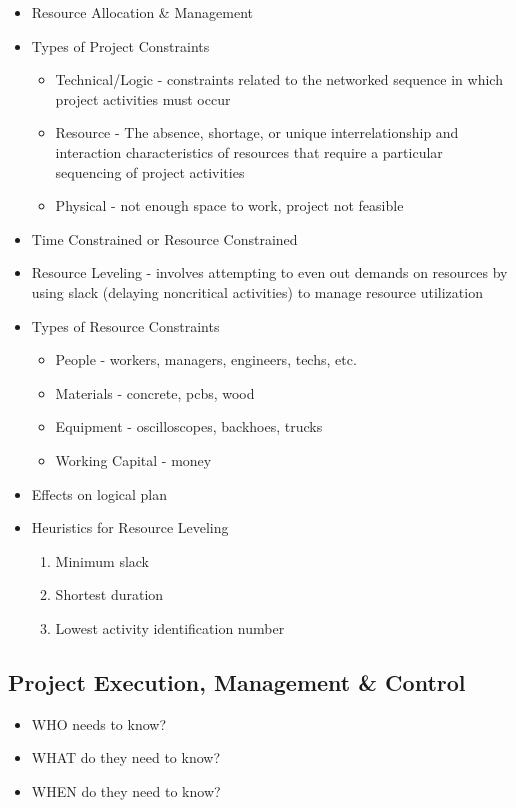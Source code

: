\documentclass[8pt, letter]{extarticle}
\begin{document}
\begin{multicols}{2}
    \begin{itemize}
        \item Resource Allocation \& Management
        \item Types of Project Constraints
            \begin{itemize}
                \item Technical/Logic - constraints related to the networked sequence in which project activities must occur
                \item Resource - The absence, shortage, or unique interrelationship and interaction characteristics of resources that require a particular sequencing of project activities
                \item Physical - not enough space to work, project not feasible
            \end{itemize}
        \item Time Constrained or Resource Constrained
        \item Resource Leveling - involves attempting to even out demands on resources by using slack (delaying noncritical activities) to manage resource utilization
        \item Types of Resource Constraints
            \begin{itemize}
                \item People - workers, managers, engineers, techs, etc.
                \item Materials - concrete, pcbs, wood
                \item Equipment - oscilloscopes, backhoes, trucks
                \item Working Capital - money
            \end{itemize}
        \item Effects on logical plan
        \item Heuristics for Resource Leveling
            \begin{enumerate}
                \item Minimum slack
                \item Shortest duration
                \item Lowest activity identification number
            \end{enumerate}
    \end{itemize}

    \subsection{Project Execution, Management \& Control}
    \begin{itemize}
        \item WHO needs to know?
        \item WHAT do they need to know?
        \item WHEN do they need to know?
    \end{itemize}


\end{multicols}
\end{document}

